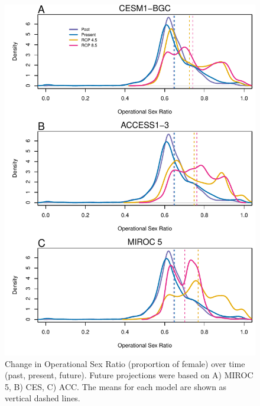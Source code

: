 \documentclass[12pt]{article}\usepackage[]{graphicx}\usepackage[dvipsnames]{xcolor}
\begin{document}

\begin{figure}[H]
	\begin{center}
		\includegraphics[width=0.80\linewidth]{Figures/POAR_OSR_MIROC_CES_ACC.pdf}
		\caption{Change in Operational Sex Ratio (proportion of female) over time (past, present, future).
			Future projections were based on A) MIROC 5, B) CES, C) ACC.
			The means for each model are shown as vertical dashed lines.}
		\label{Sup:osrall}
	\end{center}
\end{figure}
\end{document}
